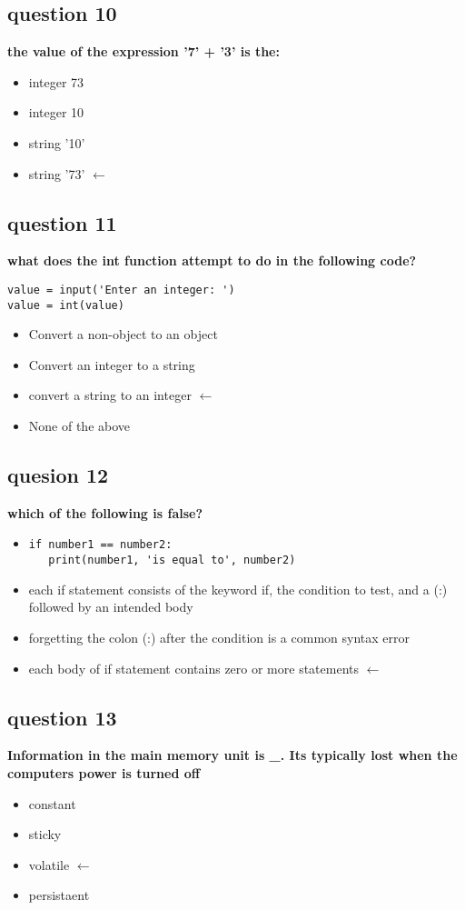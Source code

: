 \documentclass[10pt]{article}
\begin{document}
\subsection*{question 10}
\textbf{the value of the expression '7' + '3' is the:}
\begin{itemize}
\item integer 73
\item integer 10
\item string '10'
\item string '73' $\leftarrow$
\end{itemize}
\subsection*{question 11}
\textbf{what does the int function attempt to do in the following code?}
\begin{verbatim}
value = input('Enter an integer: ')
value = int(value)
\end{verbatim}
\begin{itemize}
\item Convert a non-object to an object
\item Convert an integer to a string
\item convert a string to an integer $\leftarrow$
\item None of the above
\end{itemize}
\subsection*{quesion 12}
\textbf{which of the following is false?}
\begin{itemize}
\item \begin{verbatim}
if number1 == number2:
   print(number1, 'is equal to', number2)
\end{verbatim}
\item each if statement consists of the keyword if, the condition to test, and a (:) followed by an intended body
\item forgetting the colon (:) after the condition is a common syntax error
\item each body of if statement contains zero or more statements $\leftarrow$
\end{itemize}
\subsection*{question 13}
\textbf{Information in the main memory unit is \_. Its typically lost when the computers power is turned off}
\begin{itemize}
\item constant
\item sticky
\item volatile $\leftarrow$
\item persistaent
\end{itemize}
\end{document}
